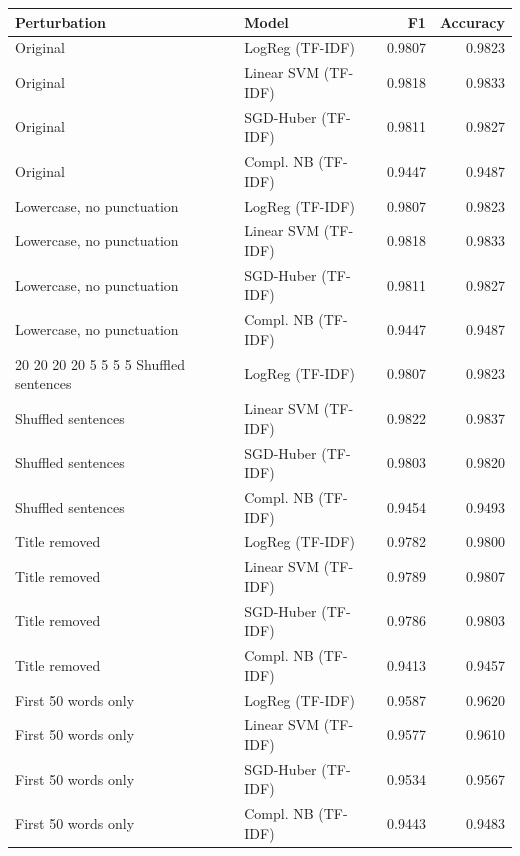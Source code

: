\begin{tabular}{llrr}
\toprule
Perturbation & Model & F1 & Accuracy \\
\midrule
Original & LogReg (TF-IDF) & 0.9807 & 0.9823 \\
Original & Linear SVM (TF-IDF) & 0.9818 & 0.9833 \\
Original & SGD-Huber (TF-IDF) & 0.9811 & 0.9827 \\
Original & Compl. NB (TF-IDF) & 0.9447 & 0.9487 \\
Lowercase, no punctuation & LogReg (TF-IDF) & 0.9807 & 0.9823 \\
Lowercase, no punctuation & Linear SVM (TF-IDF) & 0.9818 & 0.9833 \\
Lowercase, no punctuation & SGD-Huber (TF-IDF) & 0.9811 & 0.9827 \\
Lowercase, no punctuation & Compl. NB (TF-IDF) & 0.9447 & 0.9487 \\
20%
20%
20%
20%
5%
5%
5%
5%
Shuffled sentences & LogReg (TF-IDF) & 0.9807 & 0.9823 \\
Shuffled sentences & Linear SVM (TF-IDF) & 0.9822 & 0.9837 \\
Shuffled sentences & SGD-Huber (TF-IDF) & 0.9803 & 0.9820 \\
Shuffled sentences & Compl. NB (TF-IDF) & 0.9454 & 0.9493 \\
Title removed & LogReg (TF-IDF) & 0.9782 & 0.9800 \\
Title removed & Linear SVM (TF-IDF) & 0.9789 & 0.9807 \\
Title removed & SGD-Huber (TF-IDF) & 0.9786 & 0.9803 \\
Title removed & Compl. NB (TF-IDF) & 0.9413 & 0.9457 \\
First 50 words only & LogReg (TF-IDF) & 0.9587 & 0.9620 \\
First 50 words only & Linear SVM (TF-IDF) & 0.9577 & 0.9610 \\
First 50 words only & SGD-Huber (TF-IDF) & 0.9534 & 0.9567 \\
First 50 words only & Compl. NB (TF-IDF) & 0.9443 & 0.9483 \\
\bottomrule
\end{tabular}

